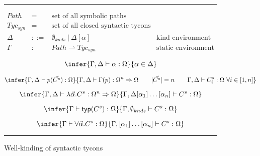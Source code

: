 
\begin{figure}
\hrule

\[\begin{array}{rcll}
Path & = & \textrm{set of all symbolic paths}\\
Tyc_{syn} & = & \textrm{set of all closed syntactic tycons}\\
\Delta & ::= &\emptyset_{knds}~|~\Delta[\alpha] & \textrm{kind environment}\\
\Gamma & : & Path \rightharpoonup Tyc_{syn} & \textrm{static environment}
 \end{array}
\]


\begin{equation}
\infer{\Gamma,\Delta \vdash \alpha : \Omega}{\alpha \in \Delta}
\label{eq:syntypevar}
\end{equation}

\begin{equation}
\infer{\Gamma,\Delta \vdash p(\vec{C^s}) : \Omega}
{\Gamma, \Delta \vdash
  \Gamma(p) :  \Omega^n \Rightarrow \Omega
  \qquad |\vec{C^s}| = n \qquad \Gamma,\Delta\vdash C^s_i : \Omega
  ~\forall i\in [1,n]}
\label{eq:syntypeapp}
\end{equation}


\begin{equation}
\infer{\Gamma,\Delta \vdash \lambda\vec{\alpha}.C^s :
  \Omega^n\Rightarrow \Omega}{\Gamma,\Delta
  [\alpha_1]\ldots[\alpha_n] \vdash C^s : \Omega}
\label{eq:syntypelam}
\end{equation}


\begin{equation}
\infer{\Gamma\vdash \mathsf{typ}(C^s) : \Omega}{\Gamma,\emptyset_{knds} \vdash
  C^s : \Omega}
\label{eq:syntypeinj}
\end{equation}

\begin{equation}
\infer{\Gamma \vdash \forall\vec{\alpha}.C^s :
  \Omega}{\Gamma,[\alpha_1]\ldots[\alpha_n]
  \vdash C^s : \Omega}
\label{eq:syntypeforall}
\end{equation}

\hrule
\caption{Well-kinding of syntactic tycons}
\label{fig:kindingsyntactic}
\end{figure}
